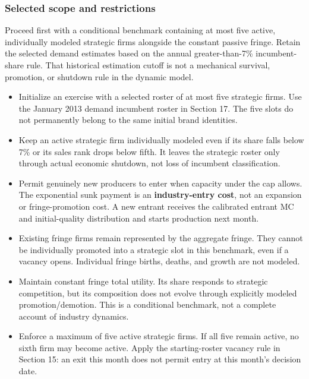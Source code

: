 \documentclass[10pt,]{article}
\providecommand{\tightlist}{%
  \setlength{\itemsep}{0pt}\setlength{\parskip}{0pt}}
\begin{document}
\subsubsection{Selected scope and
restrictions}\label{selected-scope-and-restrictions}

Proceed first with a conditional benchmark containing at most five
active, individually modeled strategic firms alongside the constant
passive fringe. Retain the selected demand estimates based on the annual
greater-than-7\% incumbent-share rule. That historical estimation cutoff
is not a mechanical survival, promotion, or shutdown rule in the dynamic
model.

\begin{itemize}
\tightlist
\item
  Initialize an exercise with a selected roster of at most five
  strategic firms. Use the January 2013 demand incumbent roster in
  Section 17. The five slots do not permanently belong to the same
  initial brand identities.
\item
  Keep an active strategic firm individually modeled even if its share
  falls below 7\% or its sales rank drops below fifth. It leaves the
  strategic roster only through actual economic shutdown, not loss of
  incumbent classification.
\item
  Permit genuinely new producers to enter when capacity under the cap
  allows. The exponential sunk payment is an \textbf{industry-entry
  cost}, not an expansion or fringe-promotion cost. A new entrant
  receives the calibrated entrant MC and initial-quality distribution
  and starts production next month.
\item
  Existing fringe firms remain represented by the aggregate fringe. They
  cannot be individually promoted into a strategic slot in this
  benchmark, even if a vacancy opens. Individual fringe births, deaths,
  and growth are not modeled.
\item
  Maintain constant fringe total utility. Its share responds to
  strategic competition, but its composition does not evolve through
  explicitly modeled promotion/demotion. This is a conditional
  benchmark, not a complete account of industry dynamics.
\item
  Enforce a maximum of five active strategic firms. If all five remain
  active, no sixth firm may become active. Apply the starting-roster
  vacancy rule in Section 15: an exit this month does not permit entry
  at this month's decision date.
\end{itemize}
\end{document}
